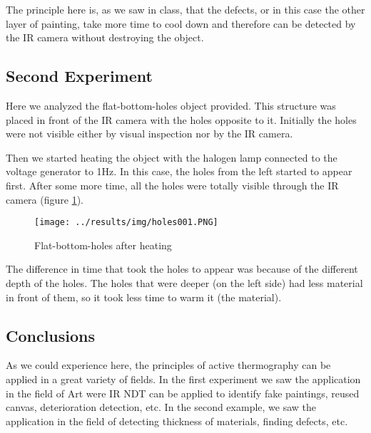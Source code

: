 \documentclass{article}
\begin{document}
The principle here is, as we saw in class, that the defects, or in this 
case the other layer of painting, take more time to cool down and therefore
can be detected by the IR camera without destroying the object.

\subsection{Second Experiment}

Here we analyzed the flat-bottom-holes object provided. This structure
was placed in front of the IR camera with the holes opposite to it.
Initially the holes were not visible either by visual inspection
nor by the IR camera.

Then we started heating the object with the halogen lamp connected to
the voltage generator to 1Hz. In this case, the holes from the left
started to appear first. After some more time, all the holes were totally
visible through the IR camera (figure \ref{fig:at2}).

\begin{figure}[H]
\centering
\begin{minipage}[b]{0.7\linewidth}
\texttt{[image: ../results/img/holes001.PNG]}
\end{minipage}
\caption{Flat-bottom-holes after heating}
\label{fig:at2}
\end{figure}

The difference in time that took the holes to appear was because
of the different depth of the holes. The holes that were deeper (on the left side)
had less material in front of them, so it took less time to warm it 
(the material).


\subsection{Conclusions}
As we could experience here, the principles of active thermography
can be applied in a great variety of fields. In the first experiment
we saw the application in the field of Art were IR NDT can be applied
to identify fake paintings, reused canvas, deterioration detection, etc.
In the second example, we saw the application in the field of 
detecting thickness of materials, finding defects, etc. 

% 
% 
\end{document}
